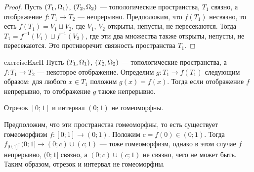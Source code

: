 \documentclass[main]{subfiles}
\begin{document}
\ImageConnectivity

\begin{proof}
	Пусть $ (T_1, \Omega_1) $, $ (T_2, \Omega_2) $ --- топологические пространства, $ T_1 $ связно, а отображение
	$ f \colon T_1 \to T_2 $ --- непрерывно. Предположим, что $ f(T_1) $ несвязно, то есть
	$ f(T_1) = V_1 \sqcup V_2 $, где $ V_1 $, $ V_2 $ открыты, непусты, не пересекаются. Тогда
	$ T_1 = f^{-1}(V_1) \sqcup f^{-1}(V_2) $, где эти два множества также открыты, непусты, не пересекаются.
	Это противоречит связность пространства $ T_1 $.
\end{proof}

\begin{restatable}{exercise}{ExcII}
	Пусть $ (T_1, \Omega_1) $, $ (T_2, \Omega_2) $ --- топологические пространства, а $ f \colon T_1 \to T_2 $ --- некоторое
	отображение. Определим $ g \colon T_1 \to f(T_1) $ следующим образом: для любого $ x \in T_1 $ положим
	$ g(x) = f(x) $. Тогда если отображение $ f $ непрерывно, то отображение $ g $ также непрерывно.
\end{restatable}

\begin{problem}
	Отрезок $ [0; 1] $ и интервал $ (0; 1) $ не гомеоморфны.
\end{problem}

\begin{solution}
	Предположим, что эти пространства гомеоморфны, то есть существует гомеоморфизм $ f \colon [0; 1] \to (0; 1) $.
	Положим $ c = f(0) \in (0; 1) $. Тогда $ f_{(0;1]} \colon (0; 1] \to (0; c) \cup (c; 1) $ --- тоже гомеоморфизм,
	однако в этом случае $ f $ непрерывно, $ (0; 1] $ связно, а $ (0; c) \cup (c; 1) $ не связно, чего не может быть.
	Таким образом, отрезок и интервал не гомеоморфны.
\end{solution}
\end{document}
